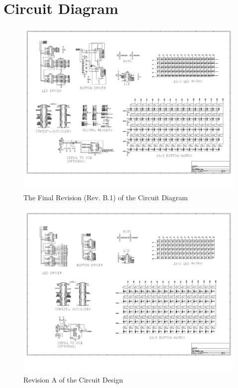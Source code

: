 \documentclass[12pt,a4paper]{report}
\begin{document}
\chapter{Circuit Diagram}
\begin{figure}[h!]
\begin{center}
	\includegraphics[width = \textwidth, angle=90, origin=c]{../Skripsie/Layout_05042019.pdf}
	\caption{The Final Revision (Rev. B.1) of the Circuit Diagram}
\end{center}
\end{figure}
\begin{figure}[h!]
	\begin{center}
		\includegraphics[width = 1.2 \textwidth, angle=90, origin=c]{../Skripsie/Layout_28022019.pdf}
		\caption{Revision A of the Circuit Design}
	\end{center}
\end{figure}
\end{document}
